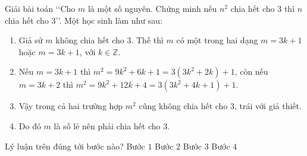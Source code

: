 \begin{ex}%
	Giải bài toán \lq\lq Cho $m$ là một số nguyên. Chứng minh  nếu $n^2$ chia hết cho $3$ thì $n$ chia hết cho $3$\rq\rq. Một học sinh làm như sau:
	\begin{enumerate}[Bước 1.]
		\item Giả sử $m$ không chia hết cho  $3$. Thế thì $m$ có một trong hai dạng $m=3k+1$ hoặc $m=3k+1$, với $k\in\mathbb{Z}$.
		\item Nếu $m=3k+1$  thì $m^2=9k^2+6k+1=3(3k^2+2k)+1$, còn nếu $m=3k+2$ thì $m^2=9k^2+12k+4=3(3k^2+4k+1)+1$.
		\item Vậy trong cả hai  trường hợp $m^2$ cũng không chia hết cho $3$, trái với giả thiết.
		\item Do đó $m$ là số lẻ nên phải chia hết  cho $3$.
	\end{enumerate}
	Lý luận trên đúng  tới bước nào?
	\choice 
		{\True  Bước $1$}
		{Bước $2$} 
		{Bước $3$} 
		{\True Bước  $4$}
\end{ex}

